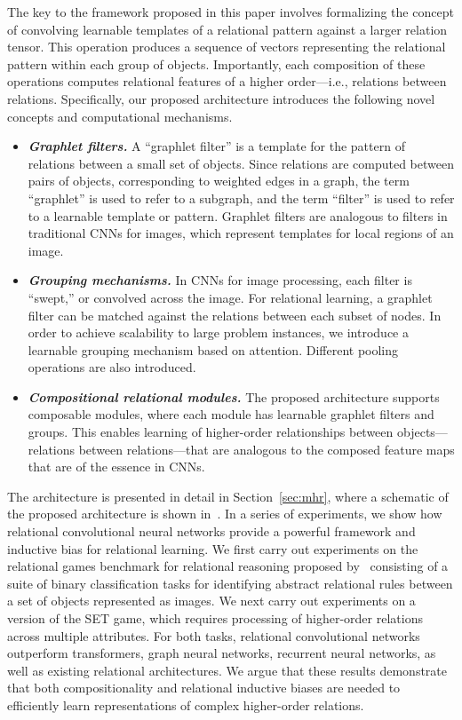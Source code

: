 The key to the framework proposed in this paper involves formalizing the concept of convolving 
learnable templates of a relational pattern against a larger relation tensor. This operation produces a sequence of vectors representing the relational pattern within each group of objects. Importantly, each composition of these operations computes relational features of a higher order---i.e., relations between relations.
Specifically, our proposed architecture introduces the 
following novel concepts and computational mechanisms.
\begin{itemize}
    \item \textit{\bfseries Graphlet filters.} A ``graphlet filter'' is a template for the pattern of relations between a small set of objects. Since relations are computed between pairs of objects, corresponding to weighted edges in a graph, the term ``graphlet'' is used to refer to a subgraph, and the term ``filter'' is used to refer to a learnable template or pattern. Graphlet filters are analogous to filters in traditional CNNs for images, which represent templates for local regions of an image.
    \item \textit{\bfseries Grouping mechanisms.} In CNNs for image processing, each filter is ``swept,'' or convolved across the image. For relational learning, a graphlet filter can be matched against the relations between each subset of nodes. In order to achieve scalability to large problem instances, we introduce a learnable grouping mechanism based on attention. Different pooling operations are also introduced.
    \item \textit{\bfseries Compositional relational modules.} The proposed architecture supports composable modules, where each module has learnable graphlet filters and groups. This enables learning 
    of higher-order relationships between objects---relations between relations---that are analogous to the composed feature maps that are of the essence in CNNs.
\end{itemize}

The architecture is presented in detail in Section~\ref{sec:mhr}, where a schematic of the proposed architecture is shown in~. 
In a series of experiments, we show how relational convolutional neural networks provide a powerful framework and inductive bias for relational learning. We first carry out experiments on the relational games benchmark for relational reasoning proposed by~\citep{shanahanExplicitlyRelationalNeural} consisting of a suite of binary classification tasks for identifying abstract relational rules between a set of objects represented as images. We next carry out experiments on a version of the SET game, which requires processing of higher-order relations across multiple attributes. For both tasks, relational convolutional networks outperform transformers, graph neural networks, recurrent neural networks, as well as existing relational architectures. We argue that these results demonstrate that both compositionality and relational inductive biases are needed to efficiently learn representations of complex higher-order relations.


